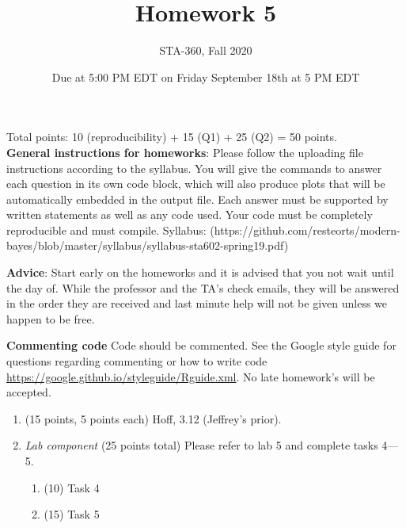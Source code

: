 \documentclass{article}
\begin{document}
\title{Homework 5}
\author{STA-360, Fall 2020}
\date{Due at 5:00 PM EDT on Friday September 18th at 5 PM EDT}

\maketitle

Total points: 10 (reproducibility) + 15 (Q1) + 25 (Q2) = 50 points. \\

\textbf{General instructions for homeworks}: Please follow the uploading file instructions according to the syllabus. You will give the commands to answer each question in its own code block, which will also produce plots that will be automatically embedded in the output file. Each answer must be supported by written statements as well as any code used. Your code must be completely reproducible and must compile. Syllabus: (https://github.com/resteorts/modern-bayes/blob/master/syllabus/syllabus-sta602-spring19.pdf)

\textbf{Advice}: Start early on the homeworks and it is advised that you not wait until the day of. While the professor and the TA's check emails, they will be answered in the order they are received and last minute help will not be given unless we happen to be free.  

\textbf{Commenting code}
Code should be commented. See the Google style guide for questions regarding commenting or how to write 
code \url{https://google.github.io/styleguide/Rguide.xml}. No late homework's will be accepted.

\begin{enumerate}
\item (15 points, 5 points each) Hoff, 3.12 (Jeffrey's prior). 


\item {\em Lab component} 
  (25 points total) Please refer to lab 5 and complete tasks 4---5. 
  \begin{enumerate}
  \item (10) Task 4
  \item (15) Task 5
  \end{enumerate}
  
\end{enumerate}
\end{document}
